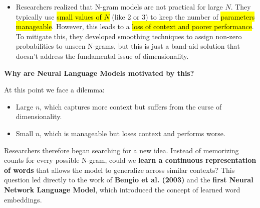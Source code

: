 \begin{itemize}
    
    \item {} Researchers realized that N-gram models are not practical for large $N$. They typically use \hl{small values of $N$} (like 2 or 3) to keep the number of \hl{parameters manageable}. However, this leads to a \hl{loss of context and poorer performance}. To mitigate this, they developed smoothing techniques to assign non-zero probabilities to unseen N-grams, but this is just a band-aid solution that doesn't address the fundamental issue of dimensionality.
\end{itemize}

\highspace
\begin{flushleft}
    \textcolor{Green3}{ \textbf{Why are Neural Language Models motivated by this?}}
\end{flushleft}
At this point we face a dilemma:
\begin{itemize}
    \item Large $n$, which captures more context but suffers from the curse of dimensionality.
    \item Small $n$, which is manageable but loses context and performs worse.
\end{itemize}
Researchers therefore began searching for a new idea. Instead of memorizing counts for every possible N-gram, could we \textbf{learn a continuous representation of words} that allows the model to generalize across similar contexts? This question led directly to the work of \textbf{Bengio et al. (2003)} and the \textbf{first Neural Network Language Model}, which introduced the concept of learned word embeddings.